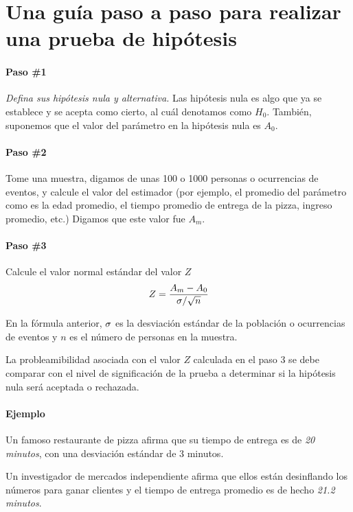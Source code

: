 \section{Una guía paso a paso para realizar una prueba de hipótesis}
\paragraph{Paso \#1}
\emph{Defina sus hipótesis nula y alternativa.} Las hipótesis nula es algo que ya se establece y se acepta como cierto, al cuál denotamos como $H_{0}.$ También, suponemos que el valor del parámetro en la hipótesis nula es $A_{0}.$

\paragraph{Paso \#2}
Tome una muestra, digamos de unas 100 o 1000 personas o ocurrencias de eventos, y calcule el valor del estimador (por ejemplo, el promedio del parámetro como es la edad promedio, el tiempo promedio de entrega de la pizza, ingreso promedio, etc.) Digamos que este valor fue $A_{m}.$

\paragraph{Paso \#3}
Calcule el valor normal estándar del valor $Z$
\begin{align}
	Z=\dfrac{A_{m}-A_{0}}{\sigma/\sqrt{n}}
\end{align}



En la fórmula anterior, $\sigma$ es la desviación estándar de la población o ocurrencias de eventos y $n$ es el número de personas en la muestra.


La probleamibilidad asociada con el valor $Z$ calculada en el paso $3$ se debe comparar con el nivel de significación de la prueba a determinar si la hipótesis nula será aceptada o rechazada.

\paragraph{Ejemplo}
Un famoso restaurante de pizza afirma que su tiempo de entrega es de \emph{20 minutos}, con una desviación estándar de 3 minutos. 

Un investigador de mercados independiente afirma que ellos están desinflando los números para ganar clientes y el tiempo de entrega promedio es de hecho \emph{21.2 minutos}.

